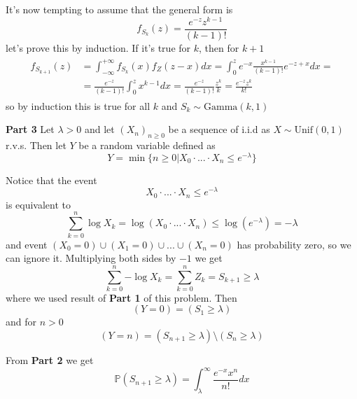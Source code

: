 \documentclass[12pt]{article}
\begin{document}
It's now tempting to assume that the general form is 
\begin{equation}
    f_{S_k}(z) = \frac{e^{-z} z^{k-1}}{(k-1)!}
\end{equation}
let's prove this by induction. If it's true for $k$, then for $k+1$
\begin{align}
    \begin{split}
    f_{S_{k+1}}(z) &= \int_{-\infty}^{+\infty}{f_{S_k}(x) f_{Z}(z-x) dx} = \int_{0}^{z}{e^{-x}\frac{x^{k-1}}{(k-1)!}e^{-z+x} dx} = \\
    &= \frac{e^{-z}}{(k-1)!} \int_{0}^{z}{x^{k-1} dx} = \frac{e^{-z}}{(k-1)!} \frac{z^k}{k} =  \frac{e^{-z}z^{k}}{k!}
    \end{split}
\end{align}
so by induction this is true for all $k$ and $S_k \sim \text{Gamma}(k, 1)$

\noindent \textbf{Part 3} Let $\lambda > 0$ and let $(X_n)_{n \geq 0}$ be a sequence of i.i.d as $X \sim \text{Unif}(0,1)$ r.v.s. Then let $Y$ be a random variable defined as 
\begin{equation}
    Y = \min\{n \geq 0 | X_0 \cdot ... \cdot X_n \leq e^{-\lambda}\}
\end{equation}

Notice that the event 
\begin{equation}
    X_0 \cdot ... \cdot X_n \leq e^{-\lambda}
\end{equation}
is equivalent to 
\begin{equation}
    \sum_{k=0}^{n}{\log X_k} = \log (X_0 \cdot ... \cdot X_n) \leq \log(e^{-\lambda}) = -\lambda 
\end{equation}
and event $(X_0 = 0) \cup (X_1 = 0) \cup ... \cup (X_n = 0)$ has probability zero, so we can ignore it. Multiplying both sides by $-1$ we get 
\begin{equation}
    \sum_{k=0}^{n}{-\log X_k} = \sum_{k=0}^{n}{Z_k} = S_{k+1} \geq \lambda
\end{equation}
where we used result of \textbf{Part 1} of this problem. Then 
\begin{equation}
    (Y = 0) = (S_1 \geq \lambda)
\end{equation}
and for $n > 0$
\begin{equation}\label{eq:1}
    (Y=n) = (S_{n+1} \geq \lambda ) \setminus (S_n \geq \lambda)
\end{equation}


From \textbf{Part 2} we get 
\begin{equation}
    \mathbb{P}(S_{n+1} \geq \lambda) = \int_{\lambda}^{\infty}{\frac{e^{-x}x^{n}}{n!} dx}
\end{equation} 
\end{document}
